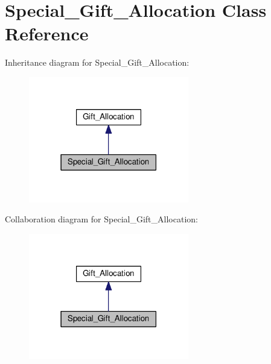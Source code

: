 \hypertarget{class_special___gift___allocation}{\section{Special\-\_\-\-Gift\-\_\-\-Allocation Class Reference}
\label{class_special___gift___allocation}
}


Inheritance diagram for Special\-\_\-\-Gift\-\_\-\-Allocation\-:
\nopagebreak
\begin{figure}[H]
\begin{center}
\leavevmode
\includegraphics[width=198pt]{class_special___gift___allocation__inherit__graph}
\end{center}
\end{figure}


Collaboration diagram for Special\-\_\-\-Gift\-\_\-\-Allocation\-:
\nopagebreak
\begin{figure}[H]
\begin{center}
\leavevmode
\includegraphics[width=198pt]{class_special___gift___allocation__coll__graph}
\end{center}
\end{figure}

